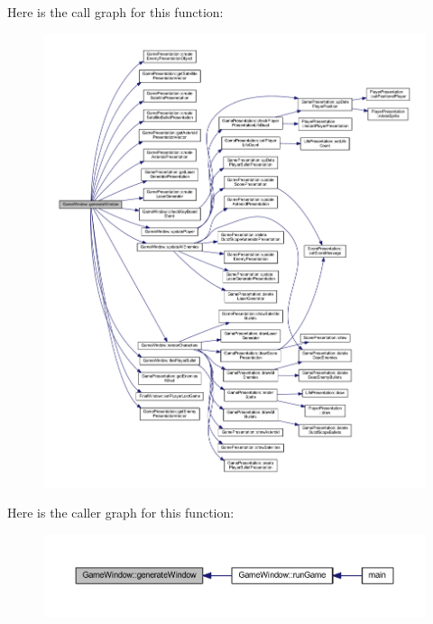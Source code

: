Here is the call graph for this function\+:\nopagebreak
\begin{figure}[H]
\begin{center}
\leavevmode
\includegraphics[width=350pt]{class_game_window_a43f64127a3b8836405f80242c1e997f4_cgraph}
\end{center}
\end{figure}
Here is the caller graph for this function\+:\nopagebreak
\begin{figure}[H]
\begin{center}
\leavevmode
\includegraphics[width=350pt]{class_game_window_a43f64127a3b8836405f80242c1e997f4_icgraph}
\end{center}
\end{figure}
\mbox{\label{class_game_window_ac32c7b2e85e30f5bab516551c6277c3a}} 
